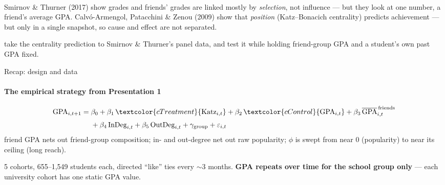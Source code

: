\documentclass[11pt, aspectratio=169]{beamer}
\title[\PaperShortTitle]{\PaperTitle}
\author[\AuthorShort]{\TitleAuthorBlock}
\institute{\TitleAffiliationBlock}
\date[\VenueShort]{\VenueDate \\ \VenueShort}
\begin{document}
\begin{frame}[plain]
  \titlepage
\end{frame}
\addtocounter{framenumber}{-1}

\begin{frame}[t]{\KeyQuestion}
  \framesubtitle{\KeyQuestionSubtitle}
  \hypertarget{main:keyq}{}%
  \medskip
   Smirnov \& Thurner (2017) show grades and friends' grades are
  linked mostly by \emph{selection}, not influence --- but they look at one
  number, a friend's average GPA. Calv\'o-Armengol, Patacchini \& Zenou (2009)
  show that \emph{position} (Katz--Bonacich centrality) predicts achievement
  --- but only in a single snapshot, so cause and effect are not separated.

  \medskip
   take the centrality prediction to Smirnov \& Thurner's
  panel data, and test it while holding friend-group GPA and a student's own
  past GPA fixed.

  \medskip

\end{frame}

\begin{frame}[t]{Recap: design and data}
  \framesubtitle{The empirical strategy from Presentation 1}
  \hypertarget{main:datarecap}{}%
  \medskip
  \[
  \begin{aligned}
    \mathrm{GPA}_{i,t+1} = {}& \beta_0 + \beta_1\,\textcolor{cTreatment}{\mathrm{Katz}_{i,t}}
      + \beta_2\,\textcolor{cControl}{\mathrm{GPA}_{i,t}}
      + \beta_3\,\overline{\mathrm{GPA}}^{\,\text{friends}}_{i,t} \\[2pt]
      & {} + \beta_4\,\mathrm{InDeg}_{i,t} + \beta_5\,\mathrm{OutDeg}_{i,t}
      + \gamma_{\text{group}} + \varepsilon_{i,t}
  \end{aligned}
  \]
   friend GPA nets out friend-group
  composition; in- and out-degree net out raw popularity; \(\phi\) is swept
  from near 0 (popularity) to near its ceiling (long reach).

  \medskip
   5 cohorts, 655--1,549 students each, directed ``like''
  ties every \(\sim\)3 months. \textbf{GPA repeats over time for the school
  group only} --- each university cohort has one static GPA value.
\end{frame}
\end{document}

